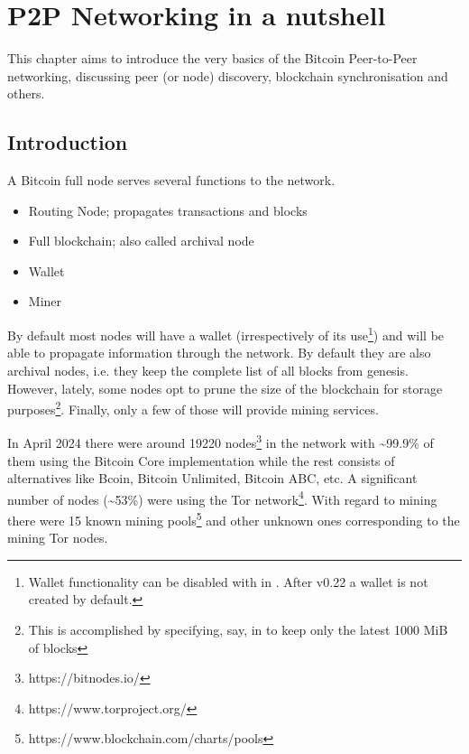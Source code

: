 \chapter{P2P Networking in a nutshell}
\label{ch:p2p-networking}

\begin{summary}
This chapter aims to introduce the very basics of the Bitcoin Peer-to-Peer networking, discussing peer (or node) discovery, blockchain synchronisation and others. 
\end{summary}

\section{Introduction}
A Bitcoin full node serves several functions to the network.

\begin{itemize}
\item Routing Node; propagates transactions and blocks
\item Full blockchain; also called archival node
\item Wallet
\item Miner
\end{itemize}

By default most nodes will have a wallet (irrespectively of its use\footnote{Wallet functionality can be disabled with  in . After v0.22 a wallet is not created by default.}) and will be able to propagate information through the network. By default they are also archival nodes, i.e. they keep the complete list of all blocks from genesis. However, lately, some nodes opt to prune the size of the blockchain for storage purposes\footnote{This is accomplished by specifying, say,   in  to keep only the latest 1000 MiB of blocks}. Finally, only a few of those will provide mining services.

In April 2024 there were around 19220 nodes\footnote{https://bitnodes.io/} in the network with \textasciitilde 99.9\% of them using the Bitcoin Core implementation while the rest consists of alternatives like Bcoin, Bitcoin Unlimited, Bitcoin ABC, etc. A significant number of nodes (\textasciitilde 53\%) were using the Tor network\footnote{https://www.torproject.org/}. With regard to mining there were 15 known mining pools\footnote{https://www.blockchain.com/charts/pools} and other unknown ones corresponding to the mining Tor nodes.


